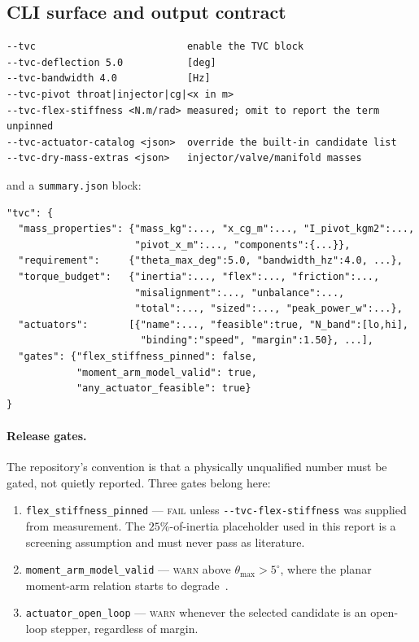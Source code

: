 \documentclass[11pt]{article}
\newcommand{\cmd}[1]{\nolinkurl{#1}}
\begin{document}
\subsection{CLI surface and output contract}

\begin{lstlisting}
--tvc                          enable the TVC block
--tvc-deflection 5.0           [deg]
--tvc-bandwidth 4.0            [Hz]
--tvc-pivot throat|injector|cg|<x in m>
--tvc-flex-stiffness <N.m/rad> measured; omit to report the term unpinned
--tvc-actuator-catalog <json>  override the built-in candidate list
--tvc-dry-mass-extras <json>   injector/valve/manifold masses
\end{lstlisting}

and a \cmd{summary.json} block:

\begin{lstlisting}
"tvc": {
  "mass_properties": {"mass_kg":..., "x_cg_m":..., "I_pivot_kgm2":...,
                      "pivot_x_m":..., "components":{...}},
  "requirement":     {"theta_max_deg":5.0, "bandwidth_hz":4.0, ...},
  "torque_budget":   {"inertia":..., "flex":..., "friction":...,
                      "misalignment":..., "unbalance":...,
                      "total":..., "sized":..., "peak_power_w":...},
  "actuators":       [{"name":..., "feasible":true, "N_band":[lo,hi],
                       "binding":"speed", "margin":1.50}, ...],
  "gates": {"flex_stiffness_pinned": false,
            "moment_arm_model_valid": true,
            "any_actuator_feasible": true}
}
\end{lstlisting}

\paragraph{Release gates.} The repository's convention is that a physically
unqualified number must be gated, not quietly reported. Three gates belong
here:
\begin{enumerate}[leftmargin=1.4em,itemsep=2pt]
\item \texttt{flex\_stiffness\_pinned} --- \textsc{fail} unless
\cmd{--tvc-flex-stiffness} was supplied from measurement. The $25\%$-of-inertia
placeholder used in this report is a screening assumption and must never pass
as literature.
\item \texttt{moment\_arm\_model\_valid} --- \textsc{warn} above
$\theta_{\max} > 5^\circ$, where the planar moment-arm relation starts to
degrade~\cite{stepp2024}.
\item \texttt{actuator\_open\_loop} --- \textsc{warn} whenever the selected
candidate is an open-loop stepper, regardless of margin.
\end{enumerate}
\end{document}

